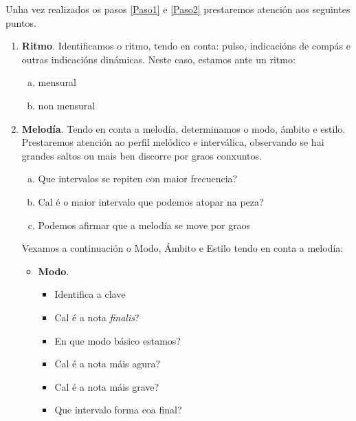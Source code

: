 \begin{multicols}{2}
Unha vez realizados os pasos \ref{Paso1} e \ref{Paso2} prestaremos atención aos seguintes puntos.
%
    \begin{enumerate}[1.-]
        \item %
        \textbf{Ritmo}. Identificamos o ritmo, tendo en conta: pulso, indicacións de compás e outras indicacións dinámicas. 
        Neste caso, estamos ante un ritmo:
        \begin{enumerate}[a)]
            \item mensural 
            \item non mensural 
        \end{enumerate}
        \item %
        \textbf{Melodía}. Tendo en conta a melodía, determinamos o modo, ámbito e estilo. Prestaremos atención ao perfil melódico e interválica, observando se hai grandes saltos ou mais ben discorre por graos conxuntos.
        \begin{enumerate}[a)]
            \item 
            Que intervalos se repiten con maior frecuencia? \dotfill
            \item 
            Cal é o maior intervalo que podemos atopar na peza? \dotfill
            \item
            Podemos afirmar que a melodía se move por graos \dotfill
        \end{enumerate}
        Vexamos a continuación o Modo, Ámbito e Estilo tendo en conta a melodía:
        \begin{itemize}
            \item %
            \textbf{Modo}.
        \begin{itemize}            
            \item 
            Identifica a clave \dotfill
            \item 
            Cal é a nota \textit{finalis}? \dotfill
            \item
            En que modo básico estamos? \dotfill
            \item
            Cal é a nota máis agura? \dotfill 
            \item
            Cal é a nota máis grave? \dotfill 
            \item
            Que intervalo forma coa final? \dotfill

\end{itemize}
\end{itemize}
\end{enumerate}
\end{multicols}
